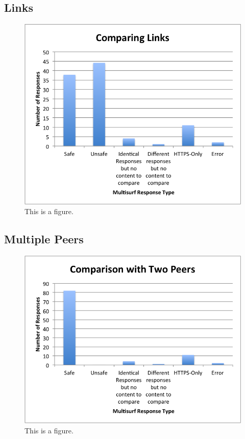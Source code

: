 \subsection{Links}

\begin{figure}[htb]
\begin{center}
\includegraphics[width=\linewidth]{links}
\caption{This is a figure.}
\end{center}
\end{figure}

\subsection{Multiple Peers}

\begin{figure}[htb]
\begin{center}
\includegraphics[width=\linewidth]{twopeers}
\caption{This is a figure.}
\end{center}
\end{figure}

